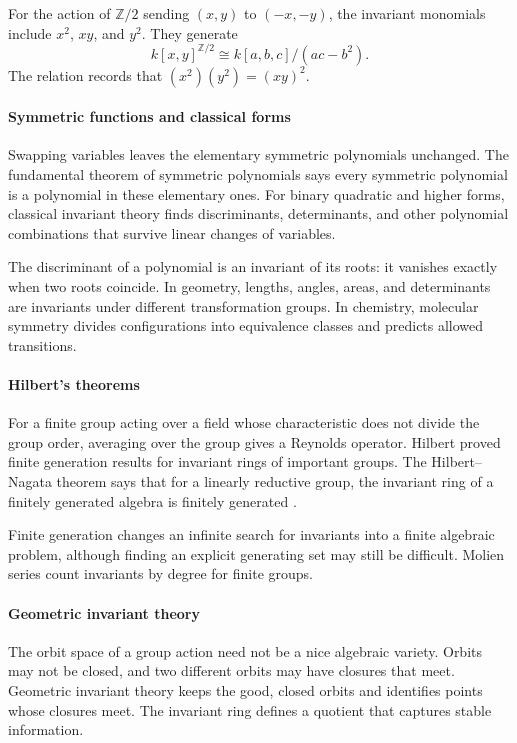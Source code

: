 For the action of $\mathbb Z/2$ sending $(x,y)$ to $(-x,-y)$, the invariant monomials include $x^2$, $xy$, and $y^2$. They generate
\[
k[x,y]^{\mathbb Z/2}\cong k[a,b,c]/(ac-b^2).
\]
The relation records that $(x^2)(y^2)=(xy)^2$.

\paragraph{Symmetric functions and classical forms}
Swapping variables leaves the elementary symmetric polynomials unchanged. The fundamental theorem of symmetric polynomials says every symmetric polynomial is a polynomial in these elementary ones. For binary quadratic and higher forms, classical invariant theory finds discriminants, determinants, and other polynomial combinations that survive linear changes of variables.

The discriminant of a polynomial is an invariant of its roots: it vanishes exactly when two roots coincide. In geometry, lengths, angles, areas, and determinants are invariants under different transformation groups. In chemistry, molecular symmetry divides configurations into equivalence classes and predicts allowed transitions.

\paragraph{Hilbert's theorems}
For a finite group acting over a field whose characteristic does not divide the group order, averaging over the group gives a Reynolds operator. Hilbert proved finite generation results for invariant rings of important groups. The Hilbert--Nagata theorem says that for a linearly reductive group, the invariant ring of a finitely generated algebra is finitely generated \cite{invariant_theory_ref2}.

Finite generation changes an infinite search for invariants into a finite algebraic problem, although finding an explicit generating set may still be difficult. Molien series count invariants by degree for finite groups.

\paragraph{Geometric invariant theory}
The orbit space of a group action need not be a nice algebraic variety. Orbits may not be closed, and two different orbits may have closures that meet. Geometric invariant theory keeps the good, closed orbits and identifies points whose closures meet. The invariant ring defines a quotient that captures stable information.

